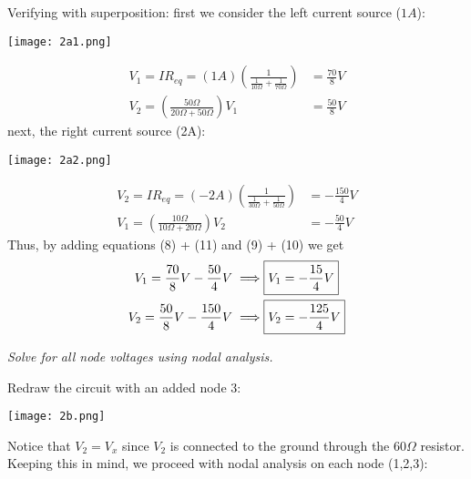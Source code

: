 \documentclass[letter]{article}
\newenvironment{menumerate}{%
  \edef\backupindent{\the\parindent}%
  \enumerate%
  \setlength{\parindent}{\backupindent}%
}{\endenumerate}
\begin{document}
\begin{menumerate}
\begin{menumerate}
        Verifying with superposition: first we consider the left current source ($1A$):
        \begin{center}
            \texttt{[image: 2a1.png]}
        \end{center}
        \begin{align}
            V_1 = IR_{eq} = (1A)(\frac{1}{\frac{1}{10\Omega} + \frac{1}{70\Omega}}) &= \frac{70}{8}V \\
            V_2 = (\frac{50\Omega}{20\Omega + 50\Omega})V_1 &= \frac{50}{8}V
        \end{align}
        next, the right current source (2A):
        \begin{center}
            \texttt{[image: 2a2.png]}
        \end{center}
        \begin{align}
            V_2 = IR_{eq} = (-2A)(\frac{1}{\frac{1}{30\Omega} + \frac{1}{50\Omega}}) &= -\frac{150}{4}V \\
            V_1 = (\frac{10\Omega}{10\Omega + 20\Omega})V_2 &= -\frac{50}{4}V
        \end{align}
        Thus, by adding equations (8) + (11) and (9) + (10) we get
        \begin{align}
            V_1 = \frac{70}{8}V - \frac{50}{4}V \implies \Aboxed{V_1 &= -\frac{15}{4}V} \\
            V_2 = \frac{50}{8}V - \frac{150}{4}V \implies \Aboxed{V_2 &= -\frac{125}{4}V}
        \end{align}
        \item \emph{Solve for all node voltages using nodal analysis.}

        Redraw the circuit with an added node 3:
        \begin{center}
        \texttt{[image: 2b.png]}
        \end{center}
        Notice that $V_2 = V_x$ since $V_2$ is connected to the ground through the $60\Omega$ resistor. Keeping this in mind, we proceed with nodal analysis on each node (1,2,3):


\end{menumerate}
\end{menumerate}
\end{document}
